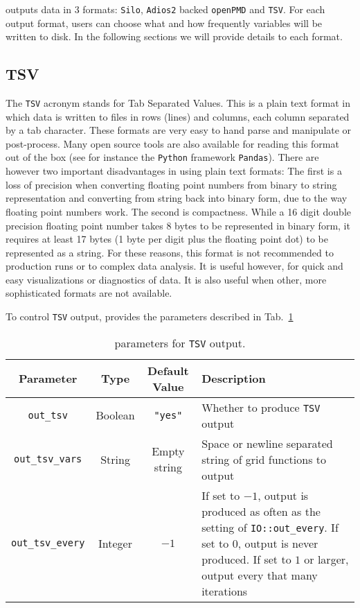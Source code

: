 \CarpetX\space outputs data in 3 formats: \texttt{Silo}, \texttt{Adios2} backed \texttt{openPMD} and \texttt{TSV}. For each output format, users can choose what and how frequently variables will be written to disk. In the following sections we will provide details to each format.

\subsection{TSV}
\label{sec:tsv}

The \texttt{TSV} acronym stands for Tab Separated Values. This is a plain text format in which data is written to files in rows (lines) and columns, each column separated by a tab character. These formats are very easy to hand parse and manipulate or post-process. Many open source tools are also available for reading this format out of the box (see for instance the \texttt{Python} framework \texttt{Pandas}). There are however two important disadvantages in using plain text formats: The first is a loss of precision when converting floating point numbers from binary to string representation and converting from string back into binary form, due to the way floating point numbers work. The second is compactness. While a 16 digit double precision floating point number takes 8 bytes to be represented in binary form, it requires at least 17 bytes (1 byte per digit plus the floating point dot) to be represented as a string. For these reasons, this format is not recommended to production runs or to complex data analysis. It is useful however, for quick and easy visualizations or diagnostics of data. It is also useful when other, more sophisticated formats are not available.

To control \texttt{TSV} output, \CarpetX\space provides the parameters described in Tab.~\ref{tab:tsv_params}

\begin{table}[ht]
  \centering
  \begin{tabularx}{\textwidth}{cccX}
    Parameter                & Type    & Default Value  & Description \\\hline\hline
    \texttt{out\_tsv}        & Boolean & \texttt{"yes"} & Whether to produce \texttt{TSV} output \\
    \texttt{out\_tsv\_vars}  & String  & Empty string   & Space or newline separated string of grid functions to output \\
    \texttt{out\_tsv\_every} & Integer & $-1$           & If set to $-1$, output is produced as often as the setting of \texttt{IO::out\_every}. If set to $0$, output is never produced. If set to $1$ or larger, output every that many iterations \\\hline\hline
  \end{tabularx}
  \label{tab:tsv_params}
  \caption{\CarpetX\space parameters for \texttt{TSV} output.}
\end{table}

